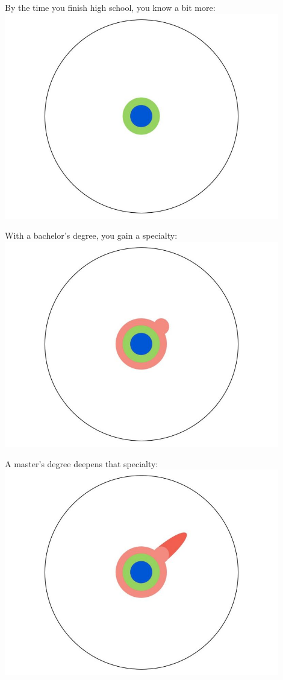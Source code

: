 \documentclass{beamer}
\begin{document}
\begin{frame}
	By the time you finish high school, you know a bit more:
	\center\includegraphics[width=0.9\textwidth]{figures/fig_3}
\end{frame}

\begin{frame}
	With a bachelor's degree, you gain a specialty:
	\center\includegraphics[width=0.9\textwidth]{figures/fig_4}
\end{frame}

\begin{frame}
	A master's degree deepens that specialty:
	\center\includegraphics[width=0.9\textwidth]{figures/fig_5}
\end{frame}
\end{document}
